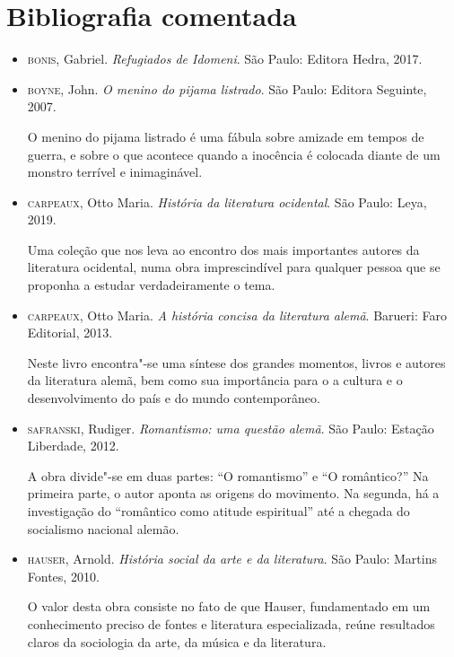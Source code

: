 \documentclass[12pt]{extarticle}
\begin{document}
\section{Bibliografia comentada}

\begin{itemize}
\item \textsc{bonis}, Gabriel. \textit{Refugiados de Idomeni}. São Paulo: Editora Hedra, 2017.

\item\textsc{boyne}, John. \textit{O menino do pijama listrado}. São Paulo: Editora
Seguinte, 2007.

O menino do pijama listrado é uma fábula sobre amizade em tempos de
guerra, e sobre o que acontece quando a inocência é colocada diante de
um monstro terrível e inimaginável.

\item\textsc{carpeaux}, Otto Maria. \textit{História da literatura ocidental}. São
Paulo: Leya, 2019.

Uma coleção que nos leva ao encontro dos mais importantes autores da
literatura ocidental, numa obra imprescindível para qualquer pessoa que
se proponha a estudar verdadeiramente o tema.

\item\textsc{carpeaux}, Otto Maria. \textit{A história concisa da literatura alemã}.
Barueri: Faro Editorial, 2013.

Neste livro encontra"-se uma síntese dos grandes momentos, livros e
autores da literatura alemã, bem como sua importância para o a cultura e
o desenvolvimento do país e do mundo contemporâneo.

\item\textsc{safranski}, Rudiger. \textit{Romantismo: uma questão alemã}. São
Paulo: Estação Liberdade, 2012.

A obra divide"-se em duas partes: ``O romantismo'' e ``O romântico?'' Na
primeira parte, o autor aponta as origens do movimento. Na segunda, há a
investigação do ``romântico como atitude espiritual'' até a chegada do
socialismo nacional alemão.

\item\textsc{hauser}, Arnold. \textit{História social da arte e da literatura}. São
Paulo: Martins Fontes, 2010.

O valor desta obra consiste no fato de que Hauser, fundamentado em um
conhecimento preciso de fontes e literatura especializada, reúne
resultados claros da sociologia da arte, da música e da literatura.
\end{itemize}
\end{document}
